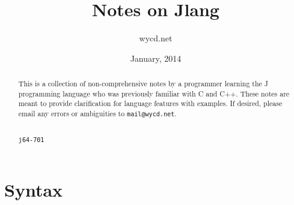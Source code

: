 \documentclass[12pt]{article}
\title{Notes on Jlang}
\author{wycd.net}
\date{January, 2014}
\begin{document}
\maketitle

\begin{abstract}
This is a collection of non-comprehensive notes by a programmer learning the
J programming language who was previously familiar with C and C++. These
notes are meant to provide clarification for language features with examples.
If desired, please email any errors or ambiguities to \texttt{mail@wycd.net}.

\mbox{}\\
\texttt{j64-701}
\end{abstract}

\tableofcontents
\clearpage

\section{Syntax}
\end{document}
